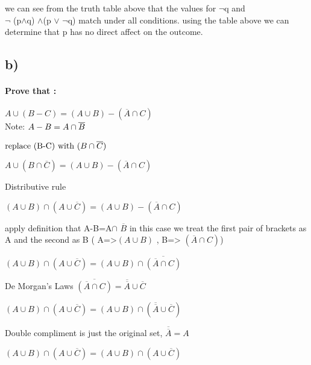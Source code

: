 \documentclass[english,10pt,a4paper]{report}
\begin{document}
we can see from the truth table above that the values for $\neg$q and \\
$\neg$ (p$\wedge$q) $\wedge$(p $\vee$ $\neg$q) match under all conditions.
using the table above we can determine that p has no direct affect on the outcome.


\subsection*{b)}
\paragraph{Prove that :}$A \cup (B-C) = (A \cup B) - (\overline{A} \cap C)$\\
Note: $ A-B = A \cap \overline{B}\\$
\begin{flushright}
 $\textmd{replace (B-C) with }(B\cap\overline{C})$
\end{flushright}
\begin{flushleft}
$A \cup (B\cap\overline{C}) = (A \cup B) - (\overline{A} \cap C) $
\end{flushleft}
\begin{flushright}
Distributive rule
\end{flushright}
\begin{flushleft}  
$(A \cup B) \cap (A\cup \overline{C})= (A \cup B) - (\overline{A} \cap C)$
\end{flushleft} 
\begin{flushright}
	apply definition that A-B=A$\cap$ $\overline{B}$ in this case we  treat the first pair of brackets as A and the second as B ( A=>$(A \cup B)$ , B=> $(\overline{A} \cap C)$)
	
\end{flushright}

$(A \cup B) \cap (A\cup \overline{C})= {(A \cup B) \cap\overline{ (\overline{A} \cap C)}} $
\begin{flushright}
De Morgan's Laws $\overline{(\overline{A}\cap C)} =  \overline{\overline{A}} \cup \overline{C}$ \\
\end{flushright}

$(A \cup B) \cap (A\cup \overline{C})= (A \cup B) \cap (\overline{\overline{A}} \cup \overline{C}) $
\begin{flushright}
	Double compliment is just the original set, $\overline{\overline{A}} = A$\\
\end{flushright}
$(A \cup B) \cap (A\cup \overline{C})= (A \cup B) \cap (A \cup \overline{C}) $
\end{document}
